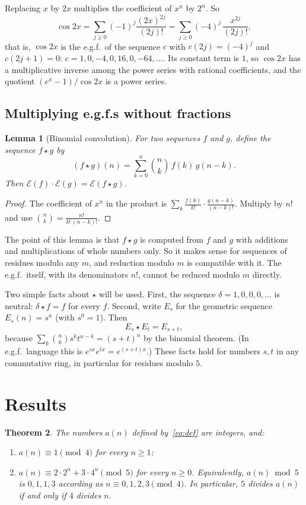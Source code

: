 \documentclass[11pt,a4paper]{article}
\newtheorem{theorem}{Theorem}[section]
\newtheorem{lemma}[theorem]{Lemma}
\theoremstyle{definition}
\theoremstyle{remark}
\begin{document}
Replacing $x$ by $2x$ multiplies the coefficient of $x^n$ by $2^n$. So
\[
\cos2x=\sum_{j\ge0}(-1)^j\frac{(2x)^{2j}}{(2j)!}=\sum_{j\ge0}(-4)^j\,\frac{x^{2j}}{(2j)!},
\]
that is, $\cos 2x$ is the e.g.f.\ of the sequence $c$ with $c(2j)=(-4)^j$ and $c(2j+1)=0$:
$c=1,0,-4,0,16,0,-64,\dots$. Its constant term is $1$, so $\cos2x$ has a multiplicative inverse among the power series
with rational coefficients, and the quotient $(e^x-1)/\cos2x$ is a power series.

\subsection{Multiplying e.g.f.s without fractions}
\begin{lemma}[Binomial convolution]\label{lem:conv}
For two sequences $f$ and $g$, define the sequence $f\star g$ by
\[
(f\star g)(n)=\sum_{k=0}^{n}\binom nk\,f(k)\,g(n-k).
\]
Then $\mathcal E(f)\cdot\mathcal E(g)=\mathcal E(f\star g)$.
\end{lemma}

\begin{proof}
The coefficient of $x^n$ in the product is $\sum_k\frac{f(k)}{k!}\cdot\frac{g(n-k)}{(n-k)!}$. Multiply by $n!$ and use
$\binom nk=\frac{n!}{k!\,(n-k)!}$.
\end{proof}

The point of this lemma is that $f\star g$ is computed from $f$ and $g$ with additions and multiplications of whole
numbers only. So it makes sense for sequences of residues modulo any $m$, and reduction modulo $m$ is compatible with
it. The e.g.f.\ itself, with its denominators $n!$, cannot be reduced modulo $m$ directly.

Two simple facts about $\star$ will be used. First, the sequence $\delta=1,0,0,0,\dots$ is neutral:
$\delta\star f=f$ for every $f$. Second, write $E_s$ for the geometric sequence $E_s(n)=s^n$ (with $s^0=1$). Then
\[
E_s\star E_t=E_{s+t},
\]
because $\sum_k\binom nks^kt^{n-k}=(s+t)^n$ by the binomial theorem. (In e.g.f.\ language this is $e^{sx}e^{tx}=e^{(s+t)x}$.)
These facts hold for numbers $s,t$ in any commutative ring, in particular for residues modulo $5$.


\section{Results}\label{sec:results}

\begin{theorem}\label{thm:main}
The numbers $a(n)$ defined by~\eqref{eq:def} are integers, and:
\begin{enumerate}[label=(\alph*)]
\item $a(n)\equiv1\pmod4$ for every $n\ge1$;
\item $a(n)\equiv2\cdot2^n+3\cdot4^n\pmod5$ for every $n\ge0$. Equivalently, $a(n)\bmod5$ is $0,1,1,3$ according as
$n\equiv0,1,2,3\pmod4$. In particular, $5$ divides $a(n)$ if and only if $4$ divides $n$.
\end{enumerate}
\end{theorem}
\end{document}
